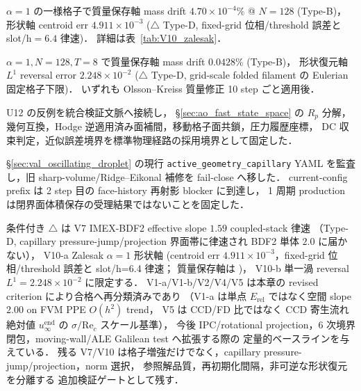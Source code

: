 \begin{description}
        $\alpha=1$ の一様格子で質量保存軸 mass drift $4.70\!\times\!10^{-4}\%$ @ $N=128$ \checkmark (Type-B)，
        形状軸 centroid err $4.911\!\times\!10^{-3}$ ($\triangle$ Type-D, fixed-grid 位相/threshold 誤差と slot/h$=6.4$ 律速)．
        詳細は表~\ref{tab:V10_zalesak}．
  \item[V10-b（単一渦反転; §\ref{sec:single_vortex_reversal}）：]
        $\alpha=1, N=128, T=8$ で質量保存軸 mass drift $0.0428\%$ \checkmark (Type-B)，
        形状復元軸 $L^1$ reversal error $2.248\times 10^{-2}$
        ($\triangle$ Type-D, grid-scale folded filament の Eulerian 固定格子下限)．
        いずれも Olsson--Kreiss 質量修正 10 step ごと適用後．
  \item[V11（アクティブ幾何毛管分解の統合ゲート；§\ref{sec:ao_fast_capillary_gate}）：]
        U12 の反例を統合検証文脈へ接続し，
        §\ref{sec:ao_fast_state_space} の
        $R_p$ 分解，幾何互換，Hodge 逆適用済み面補間，移動格子面共鎖，圧力履歴座標，
        DC 収束判定，近似誤差境界を標準物理経路の採用境界として固定した．
  \item[V12（閉界面体積 admission gate；§\ref{sec:closed_interface_volume_gate}）：]
        §\ref{sec:val_oscillating_droplet} の現行 \texttt{active\_geometry\_capillary}
        YAML を監査し，旧 sharp-volume/Ridge--Eikonal 補修を fail-close へ移した．
        current-config prefix は 2 step 目の face-history 再射影 blocker に到達し，
        1 周期 production は閉界面体積保存の受理結果ではないことを固定した．
\end{description}

条件付き $\triangle$ は V7 IMEX-BDF2 effective slope $1.59$ coupled-stack 律速
（Type-D, capillary pressure-jump/projection 界面帯に律速され BDF2 単体 $2.0$ に届かない），
V10-a Zalesak $\alpha=1$ 形状軸 (centroid err $4.911\!\times\!10^{-3}$，fixed-grid 位相/threshold 誤差と slot/h=6.4 律速；
質量保存軸は \checkmark)，
V10-b 単一渦 reversal $L^1=2.248\times10^{-2}$ に限定する．
V1-a/V1-b/V2/V4/V5 は本章の revised criterion により合格へ再分類済みであり
（V1-a は単点 $E_{\mathrm{rel}}$ ではなく空間 slope $2.00$ on FVM PPE $O(h^2)$ trend，
V5 は CCD/FD 比ではなく CCD 寄生流れ絶対値 $u_\infty^{\mathrm{end}}$ の $\sigma/\mathrm{Re}_c$ スケール基準），
今後 IPC/rotational projection，6 次境界閉包，moving-wall/ALE Galilean test へ拡張する際の
定量的ベースラインを与えている．
残る V7/V10 は格子増強だけでなく，capillary pressure-jump/projection，norm 選択，
参照解品質，再初期化間隔，非可逆な形状復元を分離する
追加検証ゲートとして残す．

